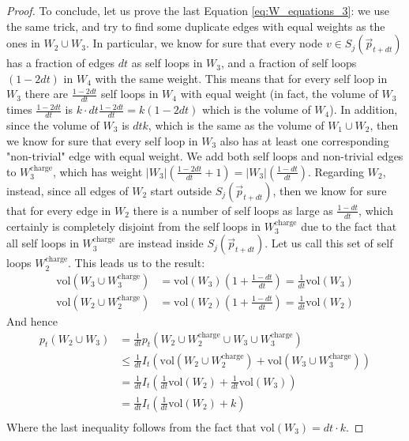 \documentclass[../main.tex]{subfiles}
\begin{document}
\begin{proof}
    To conclude, let us prove the last Equation \ref{eq:W_equations_3}: we use the same trick, and try to find some duplicate edges with equal weights as the ones in $W_2 \cup W_3$.
    In particular, we know for sure that every node $v\in S_j(\vec{p}_{t+dt})$ has a fraction of edges $dt$ as self loops in $W_3$, and a fraction of self loops $(1-2dt)$ in $W_4$ with the same weight. This means that for every self loop in $W_3$ there are $\frac{1-2dt}{dt}$ self loops in $W_4$ with equal weight (in fact, the volume of $W_3$ times $\frac{1-2dt}{dt}$ is $k \cdot dt \frac{1-2dt}{dt} = k (1-2dt)$ which is the volume of $W_4$). In addition, since the volume of $W_3$ is $dt k$, which is the same as the volume of $W_1 \cup W_2$, then we know for sure that every self loop in $W_3$ also has at least one corresponding "non-trivial" edge with equal weight. We add both self loops and non-trivial edges to $W_3^{\text{charge}}$, which has weight $|W_3|\left(\frac{1-2dt}{dt} + 1\right) = |W_3|\left(\frac{1-dt}{dt}\right)$. Regarding $W_2$, instead, since all edges of $W_2$ start outside $S_j(\vec{p}_{t+dt})$, then we know for sure that for every edge in $W_2$ there is a number of self loops as large as $\frac{1-dt}{dt}$, which certainly is completely disjoint from the self loops in $W_3^{\text{charge}}$ due to the fact that all self loops in $W_3^{\text{charge}}$ are instead inside $S_j(\vec{p}_{t+dt})$. Let us call this set of self loops $W_2^{\text{charge}}$. This leads us to the result:
    \begin{align}
        \text{vol}(W_3 \cup W_3^{\text{charge}}) & = \text{vol}(W_3)\left(1 + \frac{1-dt}{dt}\right) = \frac{1}{dt}\text{vol}(W_3) \\
        \text{vol}(W_2 \cup W_2^{\text{charge}}) & =  \text{vol}(W_2)\left(1 + \frac{1-dt}{dt}\right) = \frac{1}{dt}\text{vol}(W_2)
    \end{align}
    And hence
    \begin{align}
        p_t(W_2 \cup W_3) & = \frac{1}{dt} p_t(W_2 \cup W_2^{\text{charge}} \cup W_3 \cup W_3^{\text{charge}}) \\
        & \leq \frac{1}{dt}I_t(\text{vol}(W_2 \cup W_2^{\text{charge}}) + \text{vol}(W_3\cup W_3^{\text{charge}})) \\ 
        & = \frac{1}{dt} I_t\left(\frac{1}{dt}\text{vol}(W_2) + \frac{1}{dt} \text{vol}(W_3)\right) \\
        & = \frac{1}{dt} I_t\left(\frac{1}{dt}\text{vol}(W_2) + k\right) \\
    \end{align}
    Where the last inequality follows from the fact that $\text{vol}(W_3) = dt \cdot k$.
\end{proof}
\end{document}
